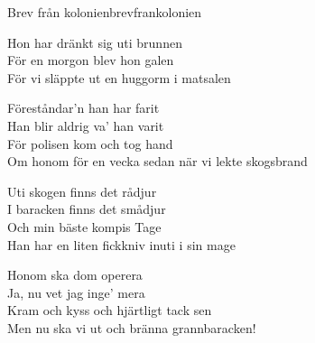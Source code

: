\begin{song}{Brev från kolonien}{brevfrankolonien}
\begin{vers}
Hon har dränkt sig uti brunnen\\
För en morgon blev hon galen\\
För vi släppte ut en huggorm i matsalen\\
\end{vers}
\begin{vers}
Föreståndar'n han har farit \\
Han blir aldrig va' han varit\\
För polisen kom och tog hand\\
Om honom för en vecka sedan när vi lekte skogsbrand\\
\end{vers}
\begin{vers}
Uti skogen finns det rådjur \\
I baracken finns det smådjur\\
Och min bäste kompis Tage\\
Han har en liten fickkniv inuti i sin mage\\
\end{vers}
\begin{vers}
Honom ska dom operera \\
Ja, nu vet jag inge' mera\\
Kram och kyss och hjärtligt tack sen\\
Men nu ska vi ut och bränna grannbaracken!\\
\end{vers}
\end{song}
